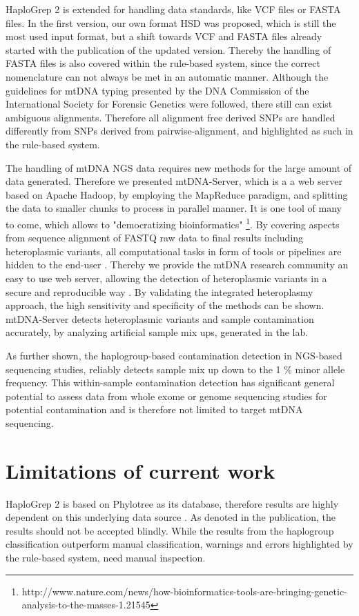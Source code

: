 HaploGrep 2 is extended for handling data standards, like VCF files or FASTA files. In the first version, our own format HSD was proposed, which is still the most used input format, but a shift towards VCF and FASTA files already started with the publication of the updated version. Thereby the handling of FASTA files is also covered within the rule-based system, since the correct nomenclature can not always be met in an automatic manner.  Although the guidelines for mtDNA typing presented by the DNA Commission of the International Society for Forensic Genetics \cite{Parson2014} were followed, there still can exist ambiguous alignments. Therefore all alignment free derived SNPs are handled differently from SNPs derived from pairwise-alignment, and highlighted as such in the rule-based system.

The handling of mtDNA NGS data requires new methods for the large amount of data generated. Therefore we presented mtDNA-Server, which is a a web server based on Apache Hadoop, by employing the MapReduce paradigm, and splitting the data to smaller chunks to process in parallel manner. It is one tool of many to come, which allows to "democratizing bioinformatics" \footnote{http://www.nature.com/news/how-bioinformatics-tools-are-bringing-genetic-analysis-to-the-masses-1.21545}. By covering aspects from sequence alignment of FASTQ raw data to final results including heteroplasmic variants, all computational tasks in form of tools or pipelines are hidden to the end-user \cite{Weissensteiner2016b}.  Thereby we provide the mtDNA research community an easy to use web server, allowing the detection of heteroplasmic variants in a secure and reproducible way \cite{Weissensteiner2016b}. By validating the integrated heteroplasmy approach, the high sensitivity and specificity of the methods can be shown. mtDNA-Server detects heteroplasmic variants and sample contamination accurately, by analyzing artificial sample mix ups, generated in the lab.

As further shown, the haplogroup-based contamination detection in NGS-based sequencing studies, reliably detects sample mix up down to the 1 \% minor allele frequency. 
This within-sample contamination detection has significant general potential to assess data from whole exome or genome sequencing studies for potential contamination and is therefore not limited to target mtDNA sequencing. 

\section{Limitations of current work}
\label{disc:sec2}
HaploGrep 2 is based on Phylotree as its database, therefore results are highly dependent on this underlying data source \cite{Weissensteiner2016a}. As denoted in the publication, the results should not be accepted blindly. While the results from the haplogroup classification outperform manual classification, warnings and errors highlighted by the rule-based system, need manual inspection. 


